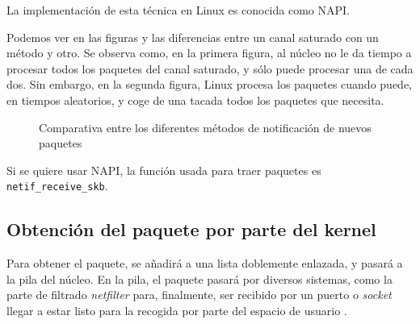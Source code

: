La implementación de esta técnica en Linux es conocida como \gls{NAPI}.

Podemos ver en las figuras  y  las diferencias entre un canal saturado 
con un método y otro. Se observa como, en la primera figura, al núcleo no le da tiempo a procesar todos los paquetes 
del canal saturado, y sólo puede procesar una de cada dos. Sin embargo, en la segunda figura, Linux procesa los 
paquetes cuando puede, en tiempos aleatorios, y coge de una tacada todos los paquetes que necesita.

\begin{figure}[hbtp]
\centering
{}%
\hspace{0.2\textwidth}
%
%
\caption{Comparativa entre los diferentes métodos de notificación de nuevos paquetes}
\end{figure}
%

Si se quiere usar NAPI, la función usada para traer paquetes es \texttt{netif\_receive\_skb}.

\subsection{Obtención del paquete por parte del kernel}
Para obtener el paquete, se añadirá a una lista doblemente enlazada, y pasará a la pila del núcleo. En la pila, el 
paquete pasará por diversos sistemas, como la parte de filtrado \emph{\gls{netfilter}} para, 
finalmente, ser recibido por un puerto o \emph{\gls{socket}} llegar a estar listo para la recogida por parte del espacio 
de usuario \cite{p206}.


